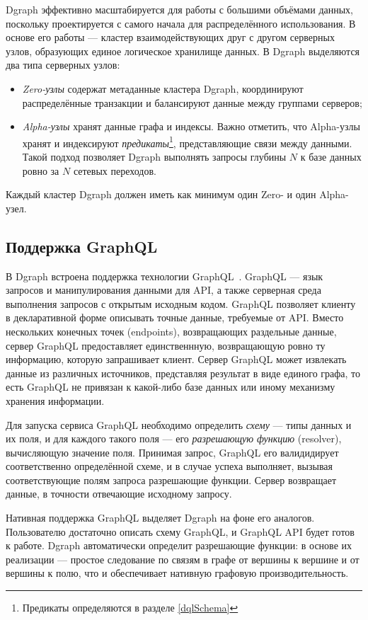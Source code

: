 Dgraph эффективно масштабируется для работы с большими объёмами данных, поскольку проектируется с
самого начала для распределённого использования. В основе его работы --- кластер взаимодействующих
друг с другом серверных узлов, образующих единое логическое хранилище данных. В Dgraph выделяются
два типа серверных узлов:
\begin{itemize}
    \item \textit{Zero-узлы} содержат метаданные кластера Dgraph, координируют распределённые
транзакции и балансируют данные между группами серверов;
    \item \textit{Alpha-узлы} хранят данные графа и индексы. Важно отметить, что Alpha-узлы хранят
и индексируют \textit{предикаты}\footnote{Предикаты определяются в разделе \ref{dqlSchema}},
представляющие связи между данными. Такой подход позволяет Dgraph выполнять запросы глубины $N$ к
базе данных ровно за $N$ сетевых переходов.
\end{itemize}
Каждый кластер Dgraph должен иметь как минимум один Zero- и один Alpha-узел.

\subsection{Поддержка GraphQL}

В Dgraph встроена поддержка технологии GraphQL~\cite{graphql}. GraphQL --- язык запросов и
манипулирования данными для API, а также серверная среда выполнения запросов с открытым исходным
кодом. GraphQL позволяет клиенту в декларативной форме описывать точные данные, требуемые от API.
Вместо нескольких конечных точек (endpoints), возвращающих раздельные данные, сервер GraphQL
предоставляет единственнную, возвращающую ровно ту информацию, которую запрашивает клиент. Сервер
GraphQL может извлекать данные из различных источников, представляя результат в виде единого графа,
то есть GraphQL не привязан к какой-либо базе данных или иному механизму хранения информации.

Для запуска сервиса GraphQL необходимо определить \textit{схему} --- типы данных и их поля, и для
каждого такого поля --- его \textit{разрешающую функцию} (resolver), вычисляющую значение поля.
Принимая запрос, GraphQL его валидидирует соответственно определённой схеме, и в случае успеха
выполняет, вызывая соответствующие полям запроса разрешающие функции. Сервер возвращает данные, в
точности отвечающие исходному запросу.

Нативная поддержка GraphQL выделяет Dgraph на фоне его аналогов. Пользователю достаточно описать
схему GraphQL, и GraphQL API будет готов к работе. Dgraph автоматически определит разрешающие
функции: в основе их реализации --- простое следование по связям в графе от вершины к вершине и от
вершины к полю, что и обеспечивает нативную графовую производительность.

